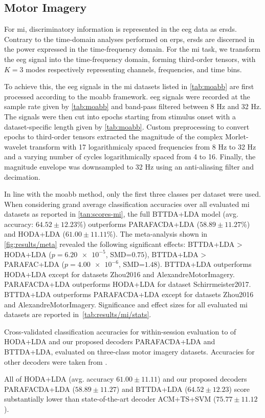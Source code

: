 \documentclass[twocolumn]{article}
\begin{document}
\subsection{Motor Imagery}

For \ac{mi}, discriminatory information is represented in the \ac{eeg} data as
\acp{ersd}.
Contrary to the time-domain analyses performed on \acp{erp}, \acp{ersd} are
discerned in the power expressed in the time-frequency domain.
For the \ac{mi} task, we transform the \ac{eeg} signal into the
time-frequency domain, forming third-order tensors, with $K=3$ modes
respectively representing channels, frequencies, and time bins.

To achieve this, the \ac{eeg} signals in the \ac{mi} datasets listed in \cref{tab:moabb}
are first processed according to the \ac{moabb} framework.
\ac{eeg} signals were recorded at the sample rate given
by \cref{tab:moabb} and band-pass filtered between 8 Hz
and 32 Hz.
The signals were then cut into epochs starting from stimulus onset with a
dataset-specific length given by \cref{tab:moabb}.
Custom preprocessing to convert epochs to third-order tensors extracted
the magnitude of the complex Morlet-wavelet transform with 17 logarithmicaly spaced frequencies from 8 Hz to 32 Hz and a varying number of cycles logarithmically spaced from 4 to 16.
Finally, the magnitude envelope was downsampled to 32 Hz using an anti-aliasing
filter and decimation.

In line with the \ac{moabb} method, only the first three classes per dataset were
used.
When considering grand average classification accuracies over all evaluated
\ac{mi} datasets as reported in \cref{tan:scores-mi},
the full BTTDA+LDA model (avg. accuracy: $64.52\pm12.23$\%)
outperforms PARAFACDA+LDA ($58.89\pm11.27$\%) and HODA+LDA
($61.00\pm11.11$\%).
The meta-analysis shown in \cref{fig:results/meta} revealed the following significant effects:
BTTDA+LDA > HODA+LDA ($p=\num{6.20e-5}$, SMD=$0.75$),
BTTDA+LDA > PARAFAC+LDA ($p=\num{4.00e-6}$, SMD=$1.48$).
BTTDA+LDA outperforms HODA+LDA except for datasets Zhou2016 and AlexandreMotorImagery.
PARAFACDA+LDA outperforms HODA+LDA for dataset Schirrmeister2017.
BTTDA+LDA outperforms PARAFACDA+LDA except for datasets Zhou2016 and AlexandreMotorImagery.
Significance and effect sizes for all evaluated \ac{mi} datasets are reported in~\cref{tab:results/mi/stats}.

\begin{sidewaystable*}
	\footnotesize
	
	\caption{Cross-validated classification accuracies for within-session evaluation
		to
		of HODA+LDA and our proposed decoders	PARAFACDA+LDA and BTTDA+LDA,
		evaluated on three-class motor imagery datasets.
		Accuracies for other decoders were taken from \textcite{Chevallier2024}.}%
	\label{tab:mi-score}%
\end{sidewaystable*}
All of HODA+LDA (avg. accuracy $61.00\pm11.11$) and our proposed decoders PARAFACDA+LDA
($58.89\pm11.27$) and BTTDA+LDA ($64.52\pm12.23$) score
substantially lower than state-of-the-art decoder ACM+TS+SVM ($75.77\pm11.12$).
\end{document}

